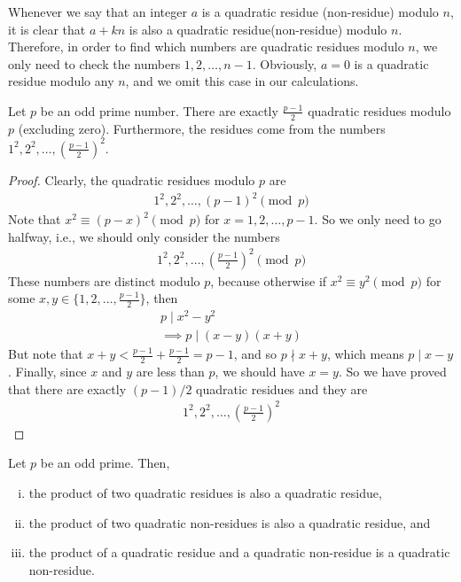 \documentclass[main.tex]{subfile}
\begin{document}
	\begin{note}
		Whenever we say that an integer $a$ is a quadratic residue (non-residue) modulo $n$, it is clear that $a+kn$ is also a quadratic residue(non-residue) modulo $n$. Therefore, in order to find which numbers are quadratic residues modulo $n$, we only need to check the numbers $1, 2, \ldots, n-1$. Obviously, $a=0$ is a quadratic residue modulo any $n$, and we omit this case in our calculations.
	\end{note}

	\begin{theorem}\label{thm:primeresidue}
		Let $p$ be an odd prime number. There are exactly $\displaystyle \frac{p-1}{2}$ quadratic residues modulo $p$ (excluding zero). Furthermore, the residues come from the numbers $1^2, 2^2, \ldots, \displaystyle \left(\frac{p-1}{2}\right)^2$.
	\end{theorem}

	\begin{proof}
		Clearly, the quadratic residues modulo $p$ are
		\begin{align*}
			1^2, 2^2, \ldots, (p-1)^2 \pmod p
		\end{align*}
		Note that $x^2 \equiv (p-x)^2 \pmod p$ for $x=1,2,\ldots,p-1$. So we only need to go halfway, i.e., we should only consider the numbers
		\begin{align*}
			1^2, 2^2, \ldots, \displaystyle \left(\frac{p-1}{2}\right)^2 \pmod p
		\end{align*}
		These numbers are distinct modulo $p$, because otherwise if $x^2 \equiv y^2 \pmod p$ for some $x,y \in \{1,2,\ldots,\frac{p-1}{2}\}$, then
		\begin{align*}
			p\mid x^2 -y^2\\
			\implies p\mid (x-y)(x+y)
		\end{align*}
		But note that $x+y< \frac{p-1}{2}+\frac{p-1}{2}=p-1$, and so $p \nmid x+y$, which means $p\mid x-y$. Finally, since $x$ and $y$ are less than $p$, we should have $x=y$.
		So we have proved that there are exactly $(p-1)/2$ quadratic residues and they are
		\begin{align*}
			1^2, 2^2, \ldots, \displaystyle \left(\frac{p-1}{2}\right)^2
		\end{align*}
	\end{proof}

	\begin{theorem}\label{thm:qrnr}
		Let $p$ be an odd prime. Then,
		\begin{enumerate}[(i)]
			\item the product of two quadratic residues is also a quadratic residue,
			\item the product of two quadratic non-residues is also a quadratic residue, and
			\item the product of a quadratic residue and a quadratic non-residue is a quadratic non-residue.
		\end{enumerate}
	\end{theorem}
\end{document}
